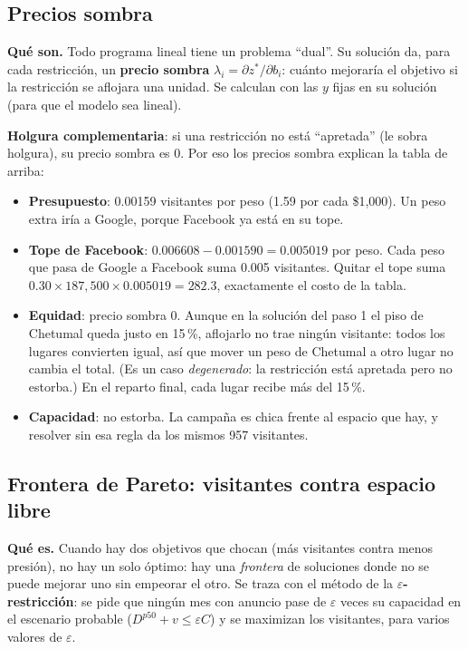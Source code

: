 \subsection{Precios sombra}
\textbf{Qué son.} Todo programa lineal tiene un problema ``dual''. Su solución da, para cada restricción, un
\textbf{precio sombra} $\lambda_i=\partial z^*/\partial b_i$: cuánto mejoraría el objetivo si la restricción se aflojara
una unidad. Se calculan con las $y$ fijas en su solución (para que el modelo sea lineal).

\textbf{Holgura complementaria}: si una restricción no está ``apretada'' (le sobra holgura), su precio sombra es 0. Por eso
los precios sombra explican la tabla de arriba:
\begin{itemize}
\item \textbf{Presupuesto}: 0.00159 visitantes por peso (1.59 por cada \$1,000). Un peso extra iría a Google, porque
  Facebook ya está en su tope.
\item \textbf{Tope de Facebook}: $0.006608-0.001590=0.005019$ por peso. Cada peso que pasa de Google a Facebook suma 0.005
  visitantes. Quitar el tope suma $0.30\times187{,}500\times0.005019=282.3$, exactamente el costo de la tabla.
\item \textbf{Equidad}: precio sombra 0. Aunque en la solución del paso 1 el piso de Chetumal queda justo en 15\,\%,
  aflojarlo no trae ningún visitante: todos los lugares convierten igual, así que mover un peso de Chetumal a otro lugar no
  cambia el total. (Es un caso \emph{degenerado}: la restricción está apretada pero no estorba.) En el reparto final, cada
  lugar recibe más del 15\,\%.
\item \textbf{Capacidad}: no estorba. La campaña es chica frente al espacio que hay, y resolver sin esa regla da los mismos
  957 visitantes.
\end{itemize}

\subsection{Frontera de Pareto: visitantes contra espacio libre}
\textbf{Qué es.} Cuando hay dos objetivos que chocan (más visitantes contra menos presión), no hay un solo óptimo: hay una
\emph{frontera} de soluciones donde no se puede mejorar uno sin empeorar el otro. Se traza con el método de la
\textbf{$\varepsilon$-restricción}: se pide que ningún mes con anuncio pase de $\varepsilon$ veces su capacidad en el
escenario probable ($D^{p50}+v\le\varepsilon C$) y se maximizan los visitantes, para varios valores de $\varepsilon$.

